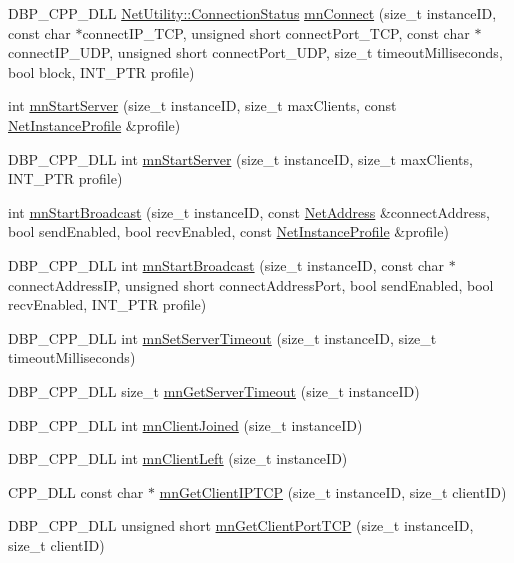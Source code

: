 \begin{DoxyCompactItemize}
\item 
DBP\_\-CPP\_\-DLL \hyperlink{class_net_utility_a7eae52138f8bd597ffc67ebf07e86b6d}{NetUtility::ConnectionStatus} \hyperlink{group__proc_commands_ga601b506b062a594ea02a44502a7b4d0f}{mnConnect} (size\_\-t instanceID, const char $\ast$connectIP\_\-TCP, unsigned short connectPort\_\-TCP, const char $\ast$connectIP\_\-UDP, unsigned short connectPort\_\-UDP, size\_\-t timeoutMilliseconds, bool block, INT\_\-PTR profile)
\item 
int \hyperlink{group__proc_commands_gac613edc6f09726bf3f105cdd0393539e}{mnStartServer} (size\_\-t instanceID, size\_\-t maxClients, const \hyperlink{class_net_instance_profile}{NetInstanceProfile} \&profile)
\item 
DBP\_\-CPP\_\-DLL int \hyperlink{group__proc_commands_ga51d3f53c0195b53dc5f73905230cf37e}{mnStartServer} (size\_\-t instanceID, size\_\-t maxClients, INT\_\-PTR profile)
\item 
int \hyperlink{group__proc_commands_ga6d38ae0c7de397bc81d86c4dc89690aa}{mnStartBroadcast} (size\_\-t instanceID, const \hyperlink{class_net_address}{NetAddress} \&connectAddress, bool sendEnabled, bool recvEnabled, const \hyperlink{class_net_instance_profile}{NetInstanceProfile} \&profile)
\item 
DBP\_\-CPP\_\-DLL int \hyperlink{group__proc_commands_ga4b8bcae5ef6c2c4f767c520d70f55111}{mnStartBroadcast} (size\_\-t instanceID, const char $\ast$connectAddressIP, unsigned short connectAddressPort, bool sendEnabled, bool recvEnabled, INT\_\-PTR profile)
\item 
DBP\_\-CPP\_\-DLL int \hyperlink{group__proc_commands_gaf5c7710b502024017c00563b640018c8}{mnSetServerTimeout} (size\_\-t instanceID, size\_\-t timeoutMilliseconds)
\item 
DBP\_\-CPP\_\-DLL size\_\-t \hyperlink{group__proc_commands_ga5b23e7eaa1da3078ae3d14fc53a6f21e}{mnGetServerTimeout} (size\_\-t instanceID)
\item 
DBP\_\-CPP\_\-DLL int \hyperlink{group__proc_commands_gaaf4e027be8ee358936898816fa653562}{mnClientJoined} (size\_\-t instanceID)
\item 
DBP\_\-CPP\_\-DLL int \hyperlink{group__proc_commands_ga66a67e72dab31e11fe04f7673767af96}{mnClientLeft} (size\_\-t instanceID)
\item 
CPP\_\-DLL const char $\ast$ \hyperlink{group__proc_commands_gaf4578bcfb95f1af86eb9b2e02c49296e}{mnGetClientIPTCP} (size\_\-t instanceID, size\_\-t clientID)
\item 
DBP\_\-CPP\_\-DLL unsigned short \hyperlink{group__proc_commands_gaf0c312f497ceedef50b30ad1d0cc625f}{mnGetClientPortTCP} (size\_\-t instanceID, size\_\-t clientID)

\end{DoxyCompactItemize}
